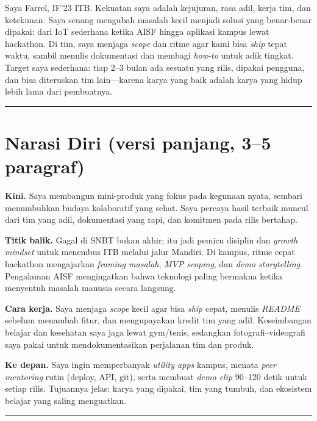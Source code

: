 \documentclass[
  letterpaper,
  DIV=11,
  numbers=noendperiod]{scrreprt}
\begin{document}
Saya Farrel, IF'23 ITB. Kekuatan saya adalah kejujuran, rasa adil, kerja
tim, dan ketekunan. Saya senang mengubah masalah kecil menjadi solusi
yang benar-benar dipakai: dari IoT sederhana ketika AISF hingga aplikasi
kampus lewat hackathon. Di tim, saya menjaga \emph{scope} dan ritme agar
kami bisa \emph{ship} tepat waktu, sambil menulis dokumentasi dan
membagi \emph{how-to} untuk adik tingkat. Target saya sederhana: tiap
2--3 bulan ada sesuatu yang rilis, dipakai pengguna, dan bisa diteruskan
tim lain---karena karya yang baik adalah karya yang hidup lebih lama
dari pembuatnya.

\begin{center}\rule{0.5\linewidth}{0.5pt}\end{center}

\section{Narasi Diri (versi panjang, 3--5
paragraf)}\label{narasi-diri-versi-panjang-35-paragraf}

\textbf{Kini.} Saya membangun mini-produk yang fokus pada kegunaan
nyata, sembari menumbuhkan budaya kolaboratif yang sehat. Saya percaya
hasil terbaik muncul dari tim yang adil, dokumentasi yang rapi, dan
komitmen pada rilis bertahap.

\textbf{Titik balik.} Gagal di SNBT bukan akhir; itu jadi pemicu
disiplin dan \emph{growth mindset} untuk menembus ITB melalui jalur
Mandiri. Di kampus, ritme cepat hackathon mengajarkan \emph{framing
masalah}, \emph{MVP scoping}, dan \emph{demo storytelling}. Pengalaman
AISF mengingatkan bahwa teknologi paling bermakna ketika menyentuh
masalah manusia secara langsung.

\textbf{Cara kerja.} Saya menjaga \emph{scope} kecil agar bisa
\emph{ship} cepat, menulis \emph{README} sebelum menambah fitur, dan
mengupayakan kredit tim yang adil. Keseimbangan belajar dan kesehatan
saya jaga lewat gym/tenis, sedangkan fotografi--videografi saya pakai
untuk mendokumentasikan perjalanan tim dan produk.

\textbf{Ke depan.} Saya ingin memperbanyak \emph{utility apps} kampus,
menata \emph{peer mentoring} rutin (deploy, API, git), serta membuat
\emph{demo clip} 90--120 detik untuk setiap rilis. Tujuannya jelas:
karya yang dipakai, tim yang tumbuh, dan ekosistem belajar yang saling
menguatkan.

\begin{center}\rule{0.5\linewidth}{0.5pt}\end{center}
\end{document}
